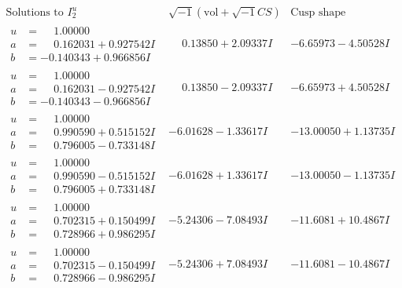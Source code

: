 \documentclass[1p]{elsarticle_modified}
\theoremstyle{definition}
\newcommand{\I}{\sqrt{-1}}
\begin{document}
$$\begin{array}{c|c|c}  
\text{Solutions to }I^u_{2}& \I (\text{vol} + \sqrt{-1}CS) & \text{Cusp shape}\\
 \hline 
\begin{aligned}
u &= \phantom{-}1.00000\phantom{ +0.000000I} \\
a &= \phantom{-}0.162031 + 0.927542 I \\
b &= -0.140343 + 0.966856 I\end{aligned}
 & \phantom{-}0.13850 + 2.09337 I & -6.65973 - 4.50528 I \\ \hline\begin{aligned}
u &= \phantom{-}1.00000\phantom{ +0.000000I} \\
a &= \phantom{-}0.162031 - 0.927542 I \\
b &= -0.140343 - 0.966856 I\end{aligned}
 & \phantom{-}0.13850 - 2.09337 I & -6.65973 + 4.50528 I \\ \hline\begin{aligned}
u &= \phantom{-}1.00000\phantom{ +0.000000I} \\
a &= \phantom{-}0.990590 + 0.515152 I \\
b &= \phantom{-}0.796005 - 0.733148 I\end{aligned}
 & -6.01628 - 1.33617 I & -13.00050 + 1.13735 I \\ \hline\begin{aligned}
u &= \phantom{-}1.00000\phantom{ +0.000000I} \\
a &= \phantom{-}0.990590 - 0.515152 I \\
b &= \phantom{-}0.796005 + 0.733148 I\end{aligned}
 & -6.01628 + 1.33617 I & -13.00050 - 1.13735 I \\ \hline\begin{aligned}
u &= \phantom{-}1.00000\phantom{ +0.000000I} \\
a &= \phantom{-}0.702315 + 0.150499 I \\
b &= \phantom{-}0.728966 + 0.986295 I\end{aligned}
 & -5.24306 - 7.08493 I & -11.6081 + 10.4867 I \\ \hline\begin{aligned}
u &= \phantom{-}1.00000\phantom{ +0.000000I} \\
a &= \phantom{-}0.702315 - 0.150499 I \\
b &= \phantom{-}0.728966 - 0.986295 I\end{aligned}
 & -5.24306 + 7.08493 I & -11.6081 - 10.4867 I \\ \hline\begin{aligned}

\end{aligned}
\end{array}$$
\end{document}
